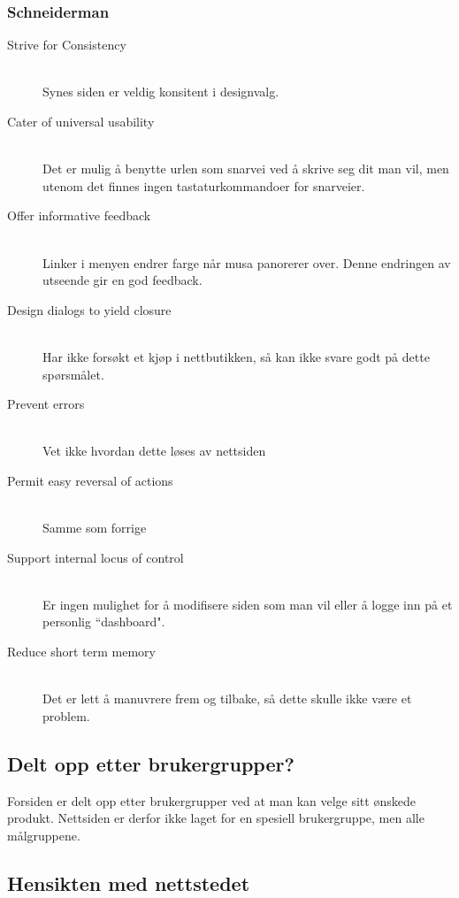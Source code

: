 \subsubsection{Schneiderman}

\begin{description}
  \item[Strive for Consistency] \hfill \\
    Synes siden er veldig konsitent i designvalg. 
\item[Cater of universal usability] \hfill \\
  Det er mulig å benytte urlen som snarvei ved å skrive seg dit man vil, men utenom det finnes ingen tastaturkommandoer for snarveier.
  \item[Offer informative feedback] \hfill \\
    Linker i menyen endrer farge når musa panorerer over. Denne endringen av utseende gir en god feedback. 
  \item[Design dialogs to yield closure] \hfill \\
    Har ikke forsøkt et kjøp i nettbutikken, så kan ikke svare godt på dette spørsmålet.
  \item[Prevent errors] \hfill \\
    Vet ikke hvordan dette løses av nettsiden
  \item[Permit easy reversal of actions] \hfill \\
    Samme som forrige 
  \item[Support internal locus of control] \hfill \\
    Er ingen mulighet for å modifisere siden som man vil eller å logge inn på et personlig ``dashboard". 
  \item[Reduce short term memory] \hfill \\
    Det er lett å manuvrere frem og tilbake, så dette skulle ikke være et problem. 
\end{description}

\subsection{Delt opp etter brukergrupper?}

Forsiden er delt opp etter brukergrupper ved at man kan velge sitt ønskede produkt. Nettsiden er derfor ikke laget for en spesiell brukergruppe, men alle målgruppene.

\subsection{Hensikten med nettstedet}


